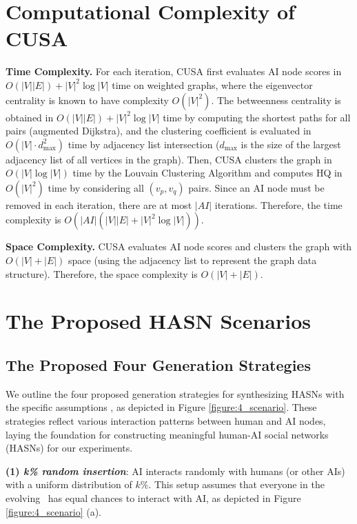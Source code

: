 \section{Computational Complexity of CUSA}
\label{sec: Computational Complexity of CUSA}

\noindent \textbf{Time Complexity.} For each iteration, CUSA first evaluates AI node scores in $O(|V||E|) + |V|^2 \log |V|$ time on weighted graphs, where the eigenvector centrality is known to have complexity $O(|V|^2)$. The betweenness centrality is obtained in $O(|V||E|) + |V|^2 \log |V|$ time by computing the shortest paths for all pairs (augmented Dijkstra), and the clustering coefficient is evaluated in $O(|V| \cdot d_{\text{max}}^2)$ time by adjacency list intersection ($d_{\text{max}}$ is the size of the largest adjacency list of all vertices in the graph). Then, CUSA clusters the graph in $O(|V| \log |V|)$ time by the Louvain Clustering Algorithm and computes HQ in $O(|V|^2)$ time by considering all $(v_p, v_q)$ pairs. Since an AI node must be removed in each iteration, there are at most $|AI|$ iterations. Therefore, the time complexity is $O(|AI|(|V||E| + |V|^2 \log |V|))$.

\noindent \textbf{Space Complexity.} CUSA evaluates AI node scores and clusters the graph with $O(|V| + |E|)$ space (using the adjacency list to represent the graph data structure). Therefore, the space complexity is $O(|V| + |E|)$.



\section{The Proposed HASN Scenarios}
\label{sec: The Proposed HASN Scenarios}

\subsection{The Proposed Four Generation Strategies}
\label{sec: The Proposed Four Generation Strategies}

We outline the four proposed generation strategies for synthesizing HASNs with the specific assumptions  \cite{nomiAI2024}\cite{zhang2024better}\cite{skjuve2021my}\cite{loveys2019reducing}, as depicted in Figure \ref{figure:4_scenario}. These strategies reflect various interaction patterns between human and AI nodes, laying the foundation for constructing meaningful human-AI social networks (HASNs) for our experiments. 

\noindent \textbf{(1) \textit{k\% random insertion}}: AI interacts randomly with humans (or other AIs) with a uniform distribution of $k\%$. This setup assumes that everyone in the evolving \XR\ has equal chances to interact with AI, as depicted in Figure \ref{figure:4_scenario} (a).

